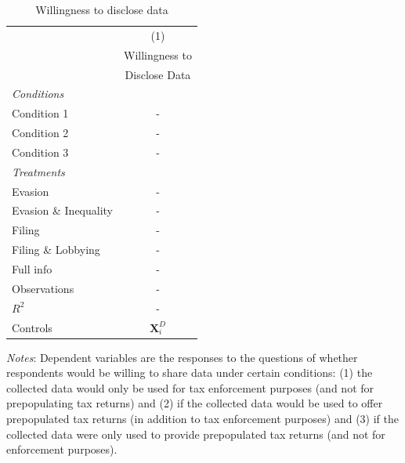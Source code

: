 \documentclass[11pt]{article}
\begin{document}
\begin{table}[!htbp]\centering
\caption{Willingness to disclose data}
\label{tab:willingnessdisclosedata}
\begin{threeparttable}
\begin{tabular}{l|c}
\toprule
& (1) \\
 & Willingness to \\
 & Disclose Data \\
 \midrule
\textit{Conditions} \\[0.25em]
Condition 1  & - \\[0.25em]
Condition 2 & -\\[0.25em]
Condition 3 & - \\[1em]
\textit{Treatments} \\[0.25em]
Evasion        & - \\[0.25em]
Evasion \& Inequality     & - \\[0.25em]
Filing             & - \\[0.25em]
Filing \& Lobbying             & - \\[0.25em]
Full info               & - \\
\midrule
Observations                        &-       \\
$R^2$                               &-    \\
Controls                 & $\mathbf{X}_{i}^{D}$     \\
\bottomrule
\end{tabular}
\begin{tablenotes}[flushleft]
\footnotesize
\item \textit{Notes}: Dependent variables are the responses to the questions of whether respondents would be willing to share data under certain conditions: (1) the collected data would only be used for tax enforcement purposes (and not for prepopulating tax returns) and (2) if the collected data would be used to offer prepopulated tax returns (in addition to tax enforcement purposes) and (3) if the collected data were only used to provide prepopulated tax returns (and not for enforcement purposes).    
\end{tablenotes}
\end{threeparttable}
\end{table} 
\end{document}
